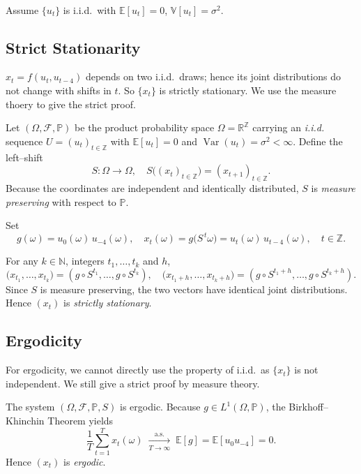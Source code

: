 \documentclass[a4paper,12pt]{article} %
\theoremstyle{nonitalic}
\newenvironment{solution}[1]
  {\renewcommand\theinnercustomsol{#1}%
   \innercustomsol}
  {\endinnercustomsol}
\newcounter{solutionctr}[section]
\renewcommand{\thesolutionctr}{(\alph{solutionctr})}
\newenvironment{autosolution}
  {\refstepcounter{solutionctr}%
   \begin{solution}{\thesolutionctr}}
  {\end{solution}}
\begin{document}
\begin{autosolution}
    \

    Assume $\{u_t\}$ is i.i.d.\ with $\mathbb{E}[u_t]=0$, $\mathbb{V}[u_t]=\sigma^2$.
    \subsection*{Strict Stationarity}

    $x_t=f(u_t,u_{t-4})$ depends on two i.i.d.\ draws; hence its joint distributions do not change with shifts in $t$.  So $\{x_t\}$ is strictly stationary.
    We use the measure thoery to give the strict proof.

    Let $(\Omega,\mathcal F,\mathbb P)$ be the product probability space
    $\Omega=\mathbb R^{\mathbb Z}$ carrying an \emph{i.i.d.} sequence
    $U=(u_t)_{t\in\mathbb Z}$ with $\mathbb E[u_t]=0$ and 
    $\operatorname{Var}(u_t)=\sigma^{2}<\infty$.
    Define the left--shift
    \[
    S:\Omega\to\Omega,\quad
    S\bigl((x_t)_{t\in\mathbb Z}\bigr) = (x_{t+1})_{t\in\mathbb Z}.
    \]
    Because the coordinates are independent and identically distributed, 
    $S$ is \emph{measure preserving} with respect to $\mathbb P$.

    Set
    \[
    g(\omega)=u_0(\omega)\,u_{-4}(\omega),\quad
    x_t(\omega)=g\!\bigl(S^{\,t}\omega\bigr)
                =u_t(\omega)\,u_{t-4}(\omega),\quad t\in\mathbb Z.
    \]

    For any $k\in\mathbb N$, integers $t_1,\dots,t_k$ and $h$,
    \[
    \bigl(x_{t_1},\dots,x_{t_k}\bigr)
        =(g\circ S^{t_1},\dots,g\circ S^{t_k}),
    \quad
    \bigl(x_{t_1+h},\dots,x_{t_k+h}\bigr)
        =(g\circ S^{t_1+h},\dots,g\circ S^{t_k+h}).
    \]
    Since $S$ is measure preserving, the two vectors have identical
    joint distributions.  Hence $(x_t)$ is \emph{strictly stationary}.

    \subsection*{Ergodicity}

    For ergodicity, we cannot directly use the property of i.i.d.\  as $\{x_t\}$ is not independent.
    We still give a strict proof by measure theory.

    The system $(\Omega,\mathcal F,\mathbb P,S)$ is ergodic.
    Because $g\in L^{1}(\Omega,\mathbb P)$, the Birkhoff--Khinchin Theorem yields
    \[
    \frac1T\sum_{t=1}^{T}x_t(\omega)
    \;\xrightarrow[T\to\infty]{\text{a.s.}}\;
    \mathbb E[g]=\mathbb E[u_0u_{-4}]=0 .
    \]
    Hence $(x_t)$ is \emph{ergodic}.


\end{autosolution}
\end{document}
